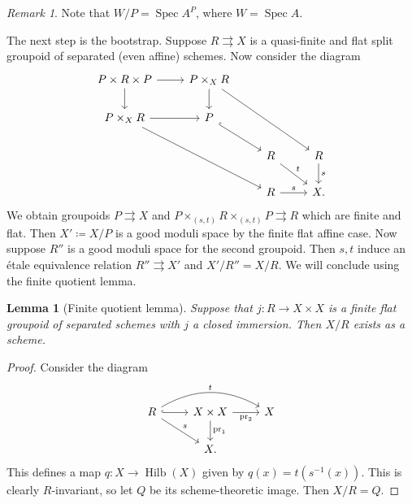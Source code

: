 \documentclass{amsart}
\newtheorem{lem}[thm]{Lemma}
\theoremstyle{definition}
\theoremstyle{remark}
\newtheorem{rmk}[thm]{Remark}
\theoremstyle{plain}
\theoremstyle{definition}
\theoremstyle{remark}
\newcommand{\on}[1]{\operatorname{#1}}
\newcommand{\1}{\mathbf{1}}
\newcommand{\2}{\mathbf{2}}
\newcommand{\3}{\mathbf{3}}
\DeclareMathOperator{\Spec}{Spec}
\begin{document}
\begin{rmk}
    Note that \(W/P = \Spec A^P\), where \(W = \Spec A\).
\end{rmk}

The next step is the bootstrap. Suppose \(R \rightrightarrows X\) is a quasi-finite and flat split groupoid of separated (even affine) schemes. Now consider the diagram
\begin{equation*}
\begin{tikzcd}
    P \times R \times P \ar{d} \ar{r} & P \times_X R \ar{d} \ar{ddrr} \\
    P \times_X R \ar{r} \ar{ddrr} & P \ar[hookrightarrow]{dr} \\
    & & R \ar{dr}{t} & R \ar{d}{s} \\
    & & R \ar{r}{s}  & X.
\end{tikzcd}
\end{equation*}
We obtain groupoids \(P \rightrightarrows X\) and \(P \times_{(s,t)} R \times_{(s,t)} P \rightrightarrows R\) which are finite and flat. Then \(X' \coloneqq X / P\) is a good moduli space by the finite flat affine case. Now suppose \(R''\) is a good moduli space for the second groupoid. Then \(s, t\) induce an \'etale equivalence relation \(R'' \rightrightarrows X'\) and \(X' / R'' = X/R\). We will conclude using the finite quotient lemma.

\begin{lem}[Finite quotient lemma]
    Suppose that \(j \colon R \to X \times X\) is a finite flat groupoid of separated schemes with \(j\) a closed immersion. Then \(X/R\) exists as a scheme.
\end{lem}

\begin{proof}
    Consider the diagram
    \begin{equation*}
    \begin{tikzcd}
        R \ar[hookrightarrow]{r} \ar[bend left=30]{rr}{t} \ar{dr}{s} & X \times X \ar{d}{\on{pr}_1} \ar{r}[swap]{\on{pr}_2} & X \\
        & X.
    \end{tikzcd}
    \end{equation*}
    This defines a map \(q \colon X \to \on{Hilb}(X)\) given by \(q(x) = t(s^{-1}(x))\). This is clearly \(R\)-invariant, so let \(Q\) be its scheme-theoretic image. Then \(X/R = Q\).
\end{proof}
\end{document}
